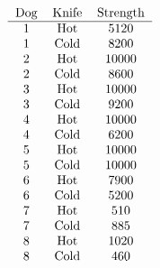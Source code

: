 \documentclass[14pt]{exam}
\begin{document}
\begin{questions}

            $$
            \begin{tabular}{ccc}
            Dog & Knife & Strength \\ \hline
            1   & Hot   & 5120     \\
            1   & Cold  & 8200     \\
            2   & Hot   & 10000    \\
            2   & Cold  & 8600     \\
            3   & Hot   & 10000    \\
            3   & Cold  & 9200     \\
            4   & Hot   & 10000    \\
            4   & Cold  & 6200     \\
            5   & Hot   & 10000    \\
            5   & Cold  & 10000    \\
            6   & Hot   & 7900     \\
            6   & Cold  & 5200     \\
            7   & Hot   & 510      \\
            7   & Cold  & 885      \\
            8   & Hot   & 1020     \\
            8   & Cold  & 460     
            \end{tabular}
            \label{tab:10_42}
            $$
	\end{questions}

            
	
\end{document}
